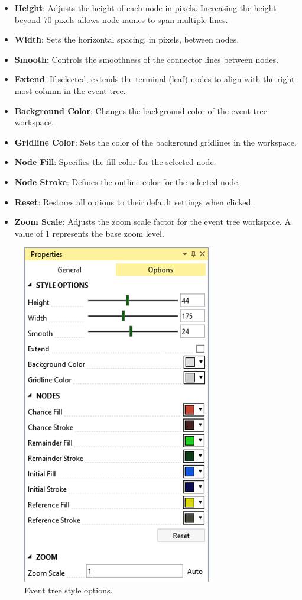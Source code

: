 \documentclass[
]{book}
\begin{document}
\begin{itemize}
\item
  \textbf{Height}: Adjusts the height of each node in pixels. Increasing the height beyond 70 pixels allows node names to span multiple lines.
\item
  \textbf{Width}: Sets the horizontal spacing, in pixels, between nodes.
\item
  \textbf{Smooth}: Controls the smoothness of the connector lines between nodes.
\item
  \textbf{Extend}: If selected, extends the terminal (leaf) nodes to align with the right-most column in the event tree.
\item
  \textbf{Background Color}: Changes the background color of the event tree workspace.
\item
  \textbf{Gridline Color}: Sets the color of the background gridlines in the workspace.
\item
  \textbf{Node Fill}: Specifies the fill color for the selected node.
\item
  \textbf{Node Stroke}: Defines the outline color for the selected node.
\item
  \textbf{Reset}: Restores all options to their default settings when clicked.
\item
  \textbf{Zoom Scale}: Adjusts the zoom scale factor for the event tree workspace. A value of 1 represents the base zoom level.
\end{itemize}

\begin{figure}

{\centering \includegraphics{images/figure88} 

}

\caption{Event tree style options.}\label{fig:figure-88}
\end{figure}
\end{document}
